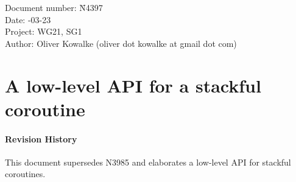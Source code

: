 \documentclass[paper=A4,pagesize,DIV=15]{scrartcl}
\begin{document}
\small
\begin{tabbing}
    Document number: \= N4397\\
    Date:            -03-23\\
    Project:         \> WG21, SG1\\
    Author:          \> Oliver Kowalke (oliver dot kowalke at gmail dot com)\\
\end{tabbing}

\section*{A low-level API for a stackful coroutine}


\tableofcontents


\paragraph*{Revision History}
This document supersedes N3985 and elaborates a low-level API for stackful
coroutines.















\end{document}
